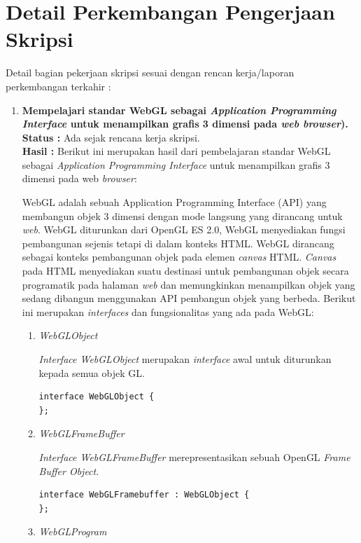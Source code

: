 \documentclass[a4paper,twoside]{article}
\begin{document}
\section{Detail Perkembangan Pengerjaan Skripsi}
Detail bagian pekerjaan skripsi sesuai dengan rencan kerja/laporan perkembangan terkahir :
	\begin{enumerate}
		\item \textbf{Mempelajari standar WebGL sebagai \textit{\textbf{Application Programming Interface}} untuk menampilkan grafis 3
dimensi pada \textit{\textbf{web browser}}).}\\
		{\bf Status :} Ada sejak rencana kerja skripsi.\\
		{\bf Hasil :} Berikut ini merupakan hasil dari pembelajaran standar WebGL sebagai \textit{Application Programming Interface} untuk menampilkan grafis 3 dimensi pada web {\it browser}:

WebGL adalah sebuah Application Programming Interface (API) yang membangun objek 3 dimensi dengan mode langsung yang dirancang untuk {\it web}. WebGL diturunkan dari OpenGL ES 2.0, WebGL menyediakan fungsi pembangunan sejenis tetapi di dalam konteks HTML. WebGL dirancang sebagai konteks pembangunan objek pada elemen {\it canvas} HTML. {\it Canvas} pada HTML menyediakan suatu destinasi untuk pembangunan objek secara programatik pada halaman {\it web} dan memungkinkan menampilkan objek yang sedang dibangun menggunakan API pembangun objek yang berbeda. Berikut ini merupakan {\it interfaces} dan fungsionalitas yang ada pada WebGL:
\begin{enumerate}
\item {\it WebGLObject}

	{\it Interface WebGLObject} merupakan {\it interface} awal untuk diturunkan kepada semua objek GL.
	\begin{lstlisting}[caption={{\it Interface} awal pada WebGL.}, captionpos=b]
interface WebGLObject {
};
	\end{lstlisting}
	
\item {\it WebGLFrameBuffer}

	{\it Interface WebGLFrameBuffer} merepresentasikan sebuah OpenGL {\it Frame Buffer Object}.
	\begin{lstlisting}[caption={{\it Frame Buffer Object} pada OpenGL.}, captionpos=b]
interface WebGLFramebuffer : WebGLObject {
};
	\end{lstlisting}

\item {\it WebGLProgram}


\end{enumerate}
\end{enumerate}
\end{document}
